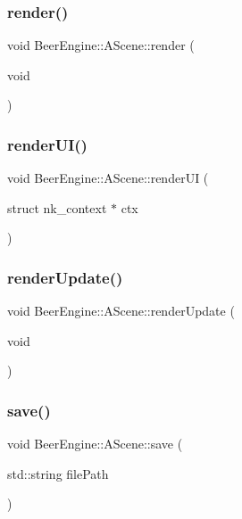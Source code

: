 \subsubsection{\texorpdfstring{render()}{render()}}
{\footnotesize\ttfamily void Beer\+Engine\+::\+A\+Scene\+::render (\begin{DoxyParamCaption}\item[{void}]{ }\end{DoxyParamCaption})}

\mbox{\label{class_beer_engine_1_1_a_scene_a93d3ef94fbd5201f10e9185833bc3e0c}} 
\subsubsection{\texorpdfstring{render\+U\+I()}{renderUI()}}
{\footnotesize\ttfamily void Beer\+Engine\+::\+A\+Scene\+::render\+UI (\begin{DoxyParamCaption}\item[{struct nk\+\_\+context $\ast$}]{ctx }\end{DoxyParamCaption})}

\mbox{\label{class_beer_engine_1_1_a_scene_accb108fe6723d99c36a85eb51a25820e}} 
\subsubsection{\texorpdfstring{render\+Update()}{renderUpdate()}}
{\footnotesize\ttfamily void Beer\+Engine\+::\+A\+Scene\+::render\+Update (\begin{DoxyParamCaption}\item[{void}]{ }\end{DoxyParamCaption})}

\mbox{\label{class_beer_engine_1_1_a_scene_a65e03ade02de4673cd25544d4843c6d8}} 
\subsubsection{\texorpdfstring{save()}{save()}}
{\footnotesize\ttfamily void Beer\+Engine\+::\+A\+Scene\+::save (\begin{DoxyParamCaption}\item[{std\+::string}]{file\+Path }\end{DoxyParamCaption})}

